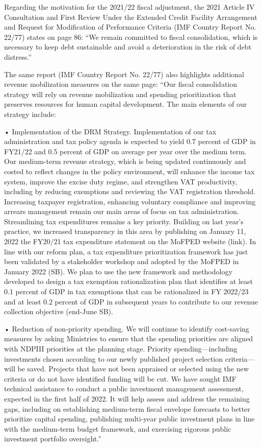 Regarding the motivation for the 2021/22 fiscal adjustment, the 2021 Article IV Consultation and First Review Under the Extended Credit Facility Arrangement and Request for Modification of Performance Criteria (IMF Country Report No. 22/77) states on page 86: “We remain committed to fiscal consolidation, which is necessary to keep debt sustainable and avoid a deterioration in the risk of debt distress.”

The same report (IMF Country Report No. 22/77) also highlights additional revenue mobilization measures on the same page: “Our fiscal consolidation strategy will rely on revenue mobilization and spending prioritization that preserves resources for human capital development. The main elements of our strategy include:

•	Implementation of the DRM Strategy. Implementation of our tax administration and tax policy agenda is expected to yield 0.7 percent of GDP in FY21/22 and 0.5 percent of GDP on average per year over the medium term. Our medium-term revenue strategy, which is being updated continuously and costed to reflect changes in the policy environment, will enhance the income tax system, improve the excise duty regime, and strengthen VAT productivity, including by reducing exemptions and reviewing the VAT registration threshold. Increasing taxpayer registration, enhancing voluntary compliance and improving arrears management remain our main areas of focus on tax administration. Streamlining tax expenditures remains a key priority. Building on last year’s practice, we increased transparency in this area by publishing on January 11, 2022 the FY20/21 tax expenditure statement on the MoFPED website (link). In line with our reform plan, a tax expenditure prioritization framework has just been validated by a stakeholder workshop and adopted by the MoFPED in January 2022 (SB). We plan to use the new framework and methodology developed to design a tax exemption rationalization plan that identifies at least 0.1 percent of GDP in tax exemptions that can be rationalized in FY 2022/23 and at least 0.2 percent of GDP in subsequent years to contribute to our revenue collection objective (end-June SB).

•	Reduction of non-priority spending. We will continue to identify cost-saving measures by asking Ministries to ensure that the spending priorities are aligned with NDPIII priorities at the planning stage. Priority spending—including investments chosen according to our newly published project selection criteria— will be saved. Projects that have not been appraised or selected using the new criteria or do not have identified funding will be cut. We have sought IMF technical assistance to conduct a public investment management assessment, expected in the first half of 2022. It will help assess and address the remaining gaps, including on establishing medium-term fiscal envelope forecasts to better prioritize capital spending, publishing multi-year public investment plans in line with the medium-term budget framework, and exercising rigorous public investment portfolio oversight.”

